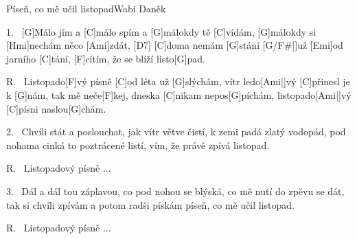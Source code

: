 \begin{song}{Píseň, co mě učil listopad}{Wabi Daněk}

\begin{xverse}{1.~}
[\large G]Málo jím a [\large C]málo spím a [\large G]málokdy tě [\large C]vídám,
[\large G]málokdy si [\large Hmi]nechám něco [\large Ami]zdát, [\large D7]{}
[\large C]doma nemám [\large G]stání [\large G/F#|]{už} [\large Emi]od jarního [\large C]tání,
[\large F]cítím, že se blíží listo[\large G]pad.
\end{xverse}

\begin{xverse}{R.~}
Listopado[\large F]vý písně [\large C]od léta už [\large G]slýchám,
vítr ledo[\large Ami|]{vý} [\large C]přinesl je k [\large G]nám,
tak mě neče[\large F]kej, dneska [\large C]nikam nepos[\large G]píchám,
listopado[\large Ami|]{vý} [\large C]písni naslou[\large G]chám.
\end{xverse}

\begin{xverse}{2.~}
Chvíli stát a poslouchat, jak vítr větve čistí,
k zemi padá zlatý vodopád,
pod nohama cinká to poztrácené listí,
vím, že právě zpívá listopad.
\end{xverse}

\begin{xverse}{R.~}
Listopadový písně ...
\end{xverse}

\begin{xverse}{3.~}
Dál a dál tou záplavou, co pod nohou se blýská,
co mě nutí do zpěvu se dát,
tak si chvíli zpívám a potom radši pískám
píseň, co mě učil listopad.
\end{xverse}

\begin{xverse}{R.~}
Listopadový písně ...
\end{xverse}

\end{song}

